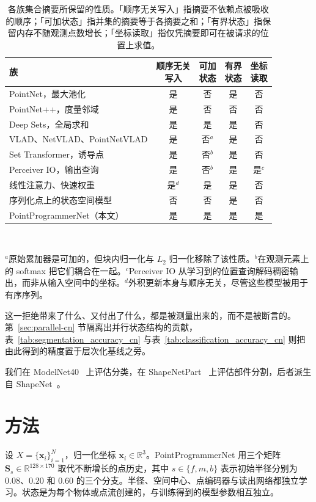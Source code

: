 \documentclass[UTF8,a4paper,11pt,fontset=windows]{ctexart}
\newcommand{\R}{\mathbb{R}}
\newcommand{\Sstate}{\mathbf{S}}
\begin{document}
\begin{table}[t]
\centering
\caption{各族集合摘要所保留的性质。「顺序无关写入」指摘要不依赖点被吸收的顺序；「可加状态」指并集的摘要等于各摘要之和；「有界状态」指保留内存不随观测点数增长；「坐标读取」指仅凭摘要即可在被请求的位置上求值。}
\label{tab:family-comparison-cn}
\small
\begin{tabular}{lcccc}
\toprule
族 & \makecell{顺序无关\\写入} & \makecell{可加\\状态} & \makecell{有界\\状态} & \makecell{坐标\\读取} \\
\midrule
PointNet，最大池化 & 是 & 否 & 是 & 否 \\
PointNet++，度量邻域 & 是 & 否 & 否 & 否 \\
Deep Sets，全局求和 & 是 & 是 & 是 & 否 \\
VLAD、NetVLAD、PointNetVLAD & 是 & 否$^{a}$ & 是 & 否 \\
Set Transformer，诱导点 & 是 & 否$^{b}$ & 是 & 否 \\
Perceiver IO，输出查询 & 是 & 否$^{b}$ & 是 & 是$^{c}$ \\
线性注意力、快速权重 & 是$^{d}$ & 是 & 是 & 否 \\
序列化点上的状态空间模型 & 否 & 否 & 是 & 否 \\
\midrule
PointProgrammerNet（本文） & 是 & 是 & 是 & 是 \\
\bottomrule
\end{tabular}
\\[3pt]
\parbox{\linewidth}{\footnotesize $^{a}$原始累加器是可加的，但块内归一化与 $L_2$ 归一化移除了该性质。$^{b}$在观测元素上的 softmax 把它们耦合在一起。$^{c}$Perceiver IO 从学习到的位置查询解码稠密输出，而非从输入空间中的坐标。$^{d}$外积更新本身与顺序无关，尽管这些模型被用于有序序列。}
\end{table}

这一拒绝带来了什么、又付出了什么，都是被测量出来的，而不是被断言的。第~\ref{sec:parallel-cn} 节隔离出并行状态结构的贡献，表~\ref{tab:segmentation_accuracy_cn} 与表~\ref{tab:classification_accuracy_cn} 则把由此得到的精度置于层次化基线之旁。

我们在 ModelNet40~\cite{wu20153dshapenets} 上评估分类，在 ShapeNetPart~\cite{yi2016scalable} 上评估部件分割，后者派生自 ShapeNet~\cite{chang2015shapenet}。

\section{方法}
设 $X=\{\bm{x}_i\}_{i=1}^N$，归一化坐标 $\bm{x}_i\in\R^3$。PointProgrammerNet 用三个矩阵 $\Sstate_s\in\R^{128\times170}$ 取代不断增长的点历史，其中 $s\in\{f,m,b\}$ 表示初始半径分别为 $0.08$、$0.20$ 和 $0.60$ 的三个分支。半径、空间中心、点编码器与读出网络都独立学习。状态是为每个物体或点流创建的，与训练得到的模型参数相互独立。
\end{document}
